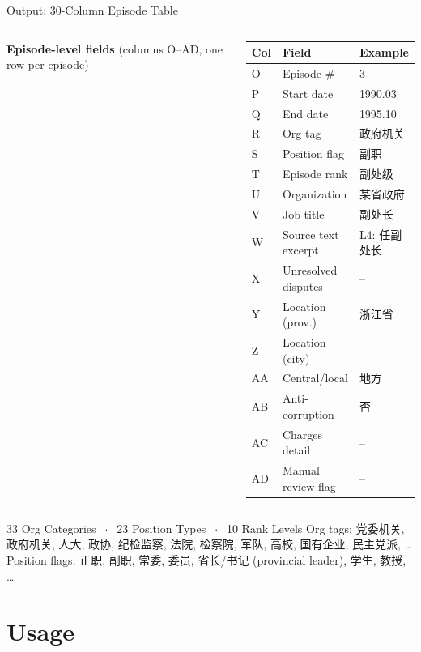 \documentclass[aspectratio=169, 10pt]{beamer}
\begin{document}
\begin{frame}[shrink=5]{Output: 30-Column Episode Table}
\begin{columns}[T]
    \textbf{Episode-level fields} (columns O–AD, one row per episode)
    \begin{center}
    \scriptsize
    \begin{tabular}{lll}
      \toprule
      Col & Field & Example \\
      \midrule
      O  & Episode \# & 3 \\
      P  & Start date & 1990.03 \\
      Q  & End date & 1995.10 \\
      R  & Org tag & 政府机关 \\
      S  & Position flag & 副职 \\
      T  & Episode rank & 副处级 \\
      U  & Organization & 某省政府 \\
      V  & Job title & 副处长 \\
      W  & Source text excerpt & L4: 任副处长 \\
      X  & Unresolved disputes & -- \\
      Y  & Location (prov.) & 浙江省 \\
      Z  & Location (city) & -- \\
      AA & Central/local & 地方 \\
      AB & Anti-corruption & 否 \\
      AC & Charges detail & -- \\
      AD & Manual review flag & -- \\
      \bottomrule
    \end{tabular}
    \end{center}
  \end{columns}

  \medskip
  \begin{alertblock}{33 Org Categories $\;\cdot\;$ 23 Position Types $\;\cdot\;$ 10 Rank Levels}
    \scriptsize
    Org tags: 党委机关, 政府机关, 人大, 政协, 纪检监察, 法院, 检察院, 军队, 高校, 国有企业, 民主党派, \ldots\\
    Position flags: 正职, 副职, 常委, 委员, 省长/书记 (provincial leader), 学生, 教授, \ldots
  \end{alertblock}
\end{frame}

\section{Usage}
\end{document}
